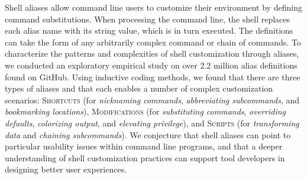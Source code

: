 Shell aliases allow command line users to customize their environment by defining command substitutions.
When processing the command line, the shell replaces each alias name with its string value, which is in turn executed.
The definitions can take the form of any arbitrarily complex command or chain of commands.
To characterize the patterns and complexities of shell customization through aliases, we conducted an exploratory empirical study on over 2.2 million alias definitions found on GitHub.
Using inductive coding methods, we found that there are three types of aliases and that each enables a number of complex customization scenarios: 
\textsc{Shortcuts} (for \emph{nicknaming commands}, \emph{abbreviating subcommands}, and \emph{bookmarking locations}),
\textsc{Modifications} (for \emph{substituting commands}, \emph{overriding defaults}, \emph{colorizing output}, and \emph{elevating privilege}),
and \textsc{Scripts} (for \emph{transforming data} and \emph{chaining subcommands}).
\TODO We conjecture that shell aliases can point to particular usability issues within command line programs, and that a deeper understanding of shell customization practices can support tool developers in designing better user experiences.